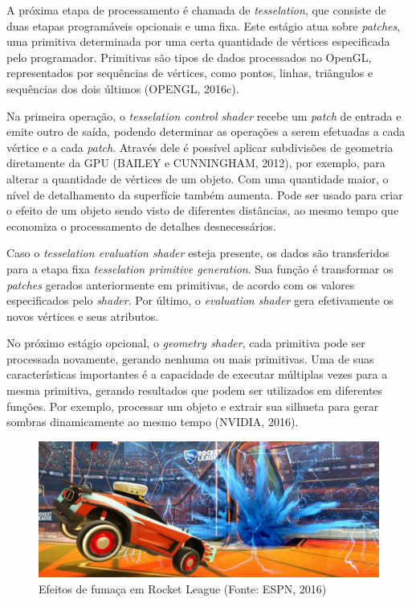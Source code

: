 A próxima etapa de processamento é chamada de \textit{tesselation}, que consiste de duas etapas programáveis opcionais e uma fixa. Este estágio atua sobre \textit{patches}, uma primitiva determinada por uma certa quantidade de vértices especificada pelo programador. Primitivas são tipos de dados processados no OpenGL, representados por sequências de vértices, como pontos, linhas, triângulos e sequências dos dois últimos (OPENGL, 2016c).

Na primeira operação, o \textit{tesselation control shader} recebe um \textit{patch} de entrada e emite outro de saída, podendo determinar as operações a serem efetuadas a cada vértice e a cada \textit{patch}. Através dele é possível aplicar subdivisões de geometria diretamente da GPU (BAILEY e CUNNINGHAM, 2012), por exemplo, para alterar a quantidade de vértices de um objeto. Com uma quantidade maior, o nível de detalhamento da superfície também aumenta. Pode ser usado para criar o efeito de um objeto sendo visto de diferentes distâncias, ao mesmo tempo que economiza o processamento de detalhes desnecessários. 

Caso o \textit{tesselation evaluation shader} esteja presente, os dados são transferidos para a etapa fixa \textit{tesselation primitive generation}. Sua função é transformar os \textit{patches} gerados anteriormente em primitivas, de acordo com os valores especificados pelo \textit{shader}. Por último, o \textit{evaluation shader} gera efetivamente os novos vértices e seus atributos.

No próximo estágio opcional, o \textit{geometry shader}, cada primitiva pode ser processada novamente, gerando nenhuma ou mais primitivas. Uma de suas características importantes é a capacidade de executar múltiplas vezes para a mesma primitiva, gerando resultados que podem ser utilizados em diferentes funções. Por exemplo, processar um objeto e extrair sua silhueta para gerar sombras dinamicamente ao mesmo tempo (NVIDIA, 2016).

\begin{figure}[H]
	\centering
	\includegraphics[scale=0.3]{imagens/rocketleague.jpg}
	\caption[Efeitos de fumaça em Rocket League]{Efeitos de fumaça em Rocket League (Fonte: ESPN, 2016)}
	\label{fig:rocketleague}
\end{figure}

